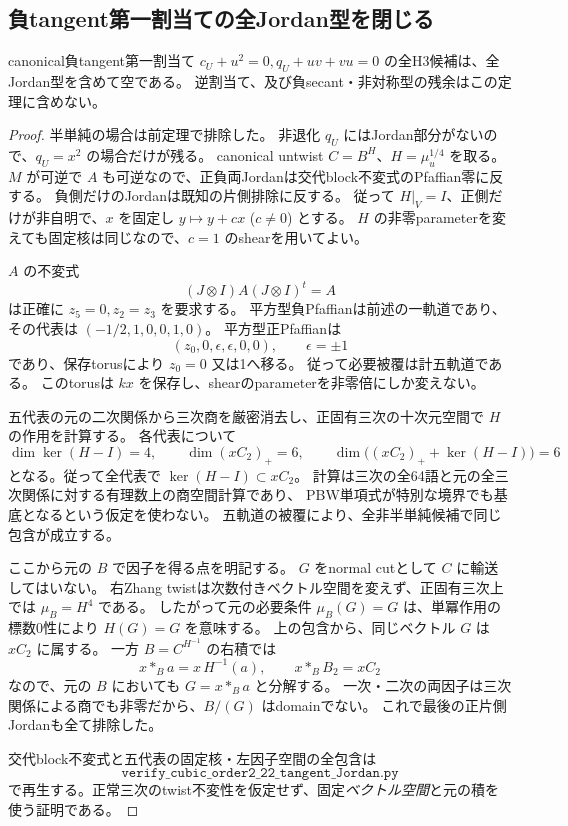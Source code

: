 \subsection{負tangent第一割当ての全Jordan型を閉じる}
\begin{theorem}\label{thm:h3-order2-22-tangent-first-all-empty}
canonical負tangent第一割当て
$c_U+u^2=0,q_U+uv+vu=0$ の全H3候補は、全Jordan型を含めて空である。
逆割当て、及び負secant・非対称型の残余はこの定理に含めない。
\end{theorem}
\begin{proof}
半単純の場合は前定理で排除した。
非退化 $q_U$ にはJordan部分がないので、$q_U=x^2$ の場合だけが残る。
canonical untwist $C=B^H$、$H=\mu_u^{1/4}$ を取る。
$M$ が可逆で $A$ も可逆なので、正負両Jordanは交代block不変式のPfaffian零に反する。
負側だけのJordanは既知の片側排除に反する。
従って $H|_V=I$、正側だけが非自明で、$x$ を固定し $y\mapsto y+cx$ ($c\ne0$) とする。
$H$ の非零parameterを変えても固定核は同じなので、$c=1$ のshearを用いてよい。

$A$ の不変式
\[
 (J\otimes I)A(J\otimes I)^t=A
\]
は正確に $z_5=0,z_2=z_3$ を要求する。
平方型負Pfaffianは前述の一軌道であり、その代表は
$(-1/2,1,0,0,1,0)$。
平方型正Pfaffianは
\[
 (z_0,0,\epsilon,\epsilon,0,0),\qquad\epsilon=\pm1
\]
であり、保存torusにより $z_0=0$ 又は1へ移る。
従って必要被覆は計五軌道である。
このtorusは $kx$ を保存し、shearのparameterを非零倍にしか変えない。

五代表の元の二次関係から三次商を厳密消去し、正固有三次の十次元空間で $H$ の作用を計算する。
各代表について
\[
 \dim\ker(H-I)=4,\qquad\dim(xC_2)_+=6,\qquad
 \dim\bigl((xC_2)_++\ker(H-I)\bigr)=6
\]
となる。従って全代表で $\ker(H-I)\subset xC_2$。
計算は三次の全64語と元の全三次関係に対する有理数上の商空間計算であり、
PBW単項式が特別な境界でも基底となるという仮定を使わない。
五軌道の被覆により、全非半単純候補で同じ包含が成立する。

ここから元の $B$ で因子を得る点を明記する。
$G$ をnormal cutとして $C$ に輸送してはいない。
右Zhang twistは次数付きベクトル空間を変えず、正固有三次上では
$\mu_B=H^4$ である。
したがって元の必要条件 $\mu_B(G)=G$ は、単冪作用の標数0性により $H(G)=G$ を意味する。
上の包含から、同じベクトル $G$ は $xC_2$ に属する。
一方 $B=C^{H^{-1}}$ の右積では
\[
 x*_B a=x\,H^{-1}(a),\qquad x*_B B_2=xC_2
\]
なので、元の $B$ においても $G=x*_B a$ と分解する。
一次・二次の両因子は三次関係による商でも非零だから、$B/(G)$ はdomainでない。
これで最後の正片側Jordanも全て排除した。

交代block不変式と五代表の固定核・左因子空間の全包含は
\[
\texttt{verify\_cubic\_order2\_22\_tangent\_Jordan.py}
\]
で再生する。正常三次のtwist不変性を仮定せず、固定\emph{ベクトル空間}と元の積を使う証明である。
\end{proof}
